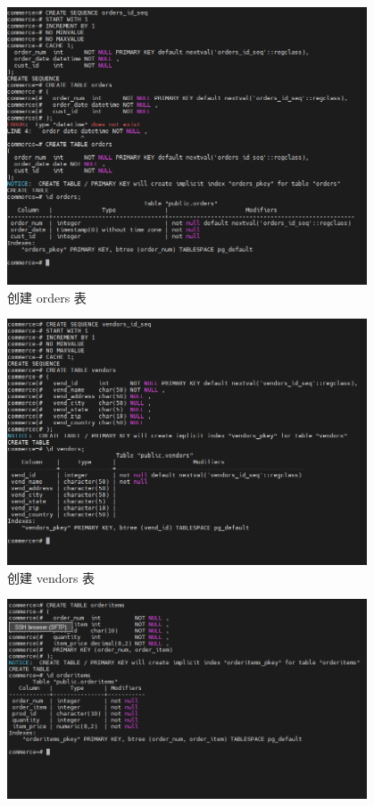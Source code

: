 \begin{enumerate}
\begin{figure}[H]
\begin{center}
    \includegraphics[width=0.95\textwidth,scale=0.5]{./figures/create_table_orders.png}
  \end{center}
  \caption{创建 orders 表}
\end{figure}
\begin{figure}[H]
  \begin{center}
    \includegraphics[width=0.95\textwidth,scale=0.5]{./figures/create_table_vendors.png}
  \end{center}
  \caption{创建 vendors 表}
\end{figure}
\begin{figure}[H]
  \begin{center}
    \includegraphics[width=0.95\textwidth,scale=0.5]{./figures/create_table_orderitems.png}

\end{center}
\end{figure}
\end{enumerate}
